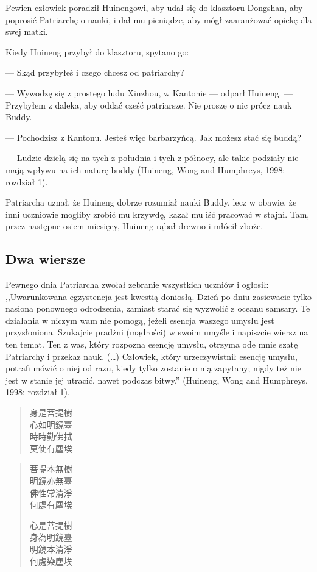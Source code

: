 Pewien człowiek poradził Huinengowi, aby udał się do klasztoru Dongshan, aby poprosić Patriarchę o nauki, i dał mu pieniądze, aby mógł zaaranżować opiekę dla swej matki.

Kiedy Huineng przybył do klasztoru, spytano go:

--- Skąd przybyłeś i czego chcesz od patriarchy?

--- Wywodzę się z prostego ludu Xinzhou, w Kantonie --- odparł Huineng. --- Przybyłem z daleka, aby oddać cześć patriarsze. Nie proszę o nic prócz nauk Buddy.

--- Pochodzisz z Kantonu. Jesteś więc barbarzyńcą. Jak możesz stać się buddą?

--- Ludzie dzielą się na tych z południa i tych z północy, ale takie podziały nie mają wpływu na ich naturę buddy (Huineng, Wong and Humphreys, 1998: rozdział 1).

Patriarcha uznał, że Huineng dobrze rozumiał nauki Buddy, lecz w obawie, że inni uczniowie mogliby zrobić mu krzywdę, kazał mu iść pracować w stajni. Tam, przez następne osiem miesięcy, Huineng rąbał drewno i młócił zboże.

\subsection{Dwa wiersze}

Pewnego dnia Patriarcha zwołał zebranie wszystkich uczniów i ogłosił: ,,Uwarunkowana egzystencja jest kwestią doniosłą. Dzień po dniu zasiewacie tylko nasiona ponownego odrodzenia, zamiast starać się wyzwolić z oceanu samsary. Te działania w niczym wam nie pomogą, jeżeli esencja waszego umysłu jest przysłoniona. Szukajcie pradżni (mądrości) w swoim umyśle i napiszcie wiersz na ten temat. Ten z was, który rozpozna esencję umysłu, otrzyma ode mnie szatę Patriarchy i przekaz nauk. (\ldots) Człowiek, który urzeczywistnił esencję umysłu, potrafi mówić o niej od razu, kiedy tylko zostanie o nią zapytany; nigdy też nie jest w stanie jej utracić, nawet podczas bitwy.'' (Huineng, Wong and Humphreys, 1998: rozdział 1).

\begin{verse}
身是菩提樹\\
心如明鏡臺\\
時時勤佛拭\\
莫使有塵埃
\end{verse}

\begin{verse}
菩提本無樹\\
明鏡亦無臺\\
佛性常清淨\\
何處有塵埃

心是菩提樹\\
身為明鏡臺\\
明鏡本清淨\\
何處染塵埃
\end{verse}

